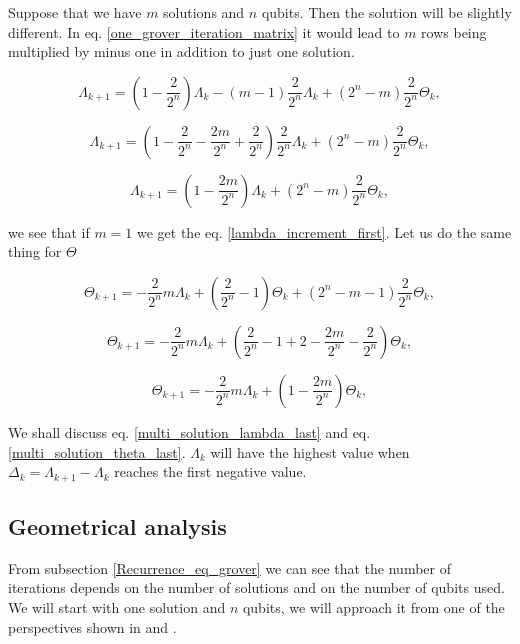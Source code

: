 Suppose that we have $m$ solutions and $n$ qubits. Then the solution will be slightly different. In eq. \ref{one_grover_iteration_matrix} it would lead to $m$ rows being multiplied by minus one in addition to just one solution. 

\begin{equation} 
    \Lambda_{k+1} = (1-\frac{2}{2^n})\Lambda_k - (m-1)\frac{2}{2^n}\Lambda_k + (2^n - m)\frac{2}{2^n}\Theta_k,
\end{equation}

\begin{equation} 
    \Lambda_{k+1} = (1-\frac{2}{2^n} - \frac{2m}{2^n} +\frac{2}{2^n})\frac{2}{2^n}\Lambda_k + (2^n - m)\frac{2}{2^n}\Theta_k,
\end{equation}

\begin{equation} \label{multi_solution_lambda_last}
    \Lambda_{k+1} = (1 - \frac{2m}{2^n})\Lambda_k + (2^n - m)\frac{2}{2^n}\Theta_k,
\end{equation}

we see that if $m=1$ we get the eq. \ref{lambda_increment_first}. Let us do the same thing for $\Theta$

\begin{equation} 
    \Theta_{k+1} = -\frac{2}{2^n}m\Lambda_k +(\frac{2}{2^n}-1)\Theta_k +(2^n - m -1)\frac{2}{2^n}\Theta_k,
\end{equation}

\begin{equation} 
    \Theta_{k+1} = -\frac{2}{2^n}m\Lambda_k +(\frac{2}{2^n}-1 + 2 - \frac{2m}{2^n} -\frac{2}{2^n})\Theta_k,
\end{equation}

\begin{equation} \label{multi_solution_theta_last}
    \Theta_{k+1} = -\frac{2}{2^n}m\Lambda_k +(1 -\frac{2m}{2^n})\Theta_k,
\end{equation}


We shall discuss eq. \ref{multi_solution_lambda_last} and eq. \ref{multi_solution_theta_last}. $\Lambda_k$ will have the highest value when $\Delta_{k}=\Lambda_{k+1}-\Lambda_k$ reaches the first negative value.
\subsection{Geometrical analysis}

From subsection \ref{Recurrence_eq_grover} we can see that the number of iterations depends on the number of solutions and on the number of qubits used. We will start with one solution and $n$ qubits, we will approach it from one of the perspectives shown in \cite{qc_grover} and \cite{qc_grover_microsoft}.

